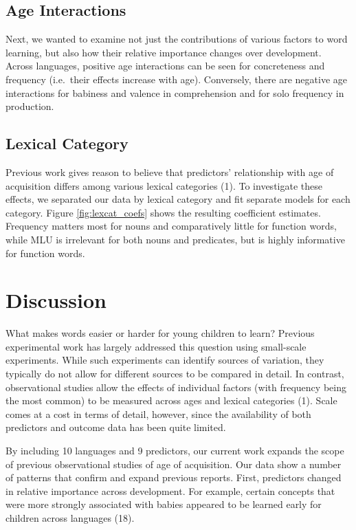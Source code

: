\documentclass[9pt,twocolumn,twoside]{pnas-new}
\begin{document}
\subsection{Age Interactions}\label{age-interactions}

Next, we wanted to examine not just the contributions of various factors
to word learning, but also how their relative importance changes over
development. Across languages, positive age interactions can be seen for
concreteness and frequency (i.e.~their effects increase with age).
Conversely, there are negative age interactions for babiness and valence
in comprehension and for solo frequency in production.

\subsection{Lexical Category}\label{lexical-category}

Previous work gives reason to believe that predictors' relationship with
age of acquisition differs among various lexical categories (1). To
investigate these effects, we separated our data by lexical category and
fit separate models for each category. Figure \ref{fig:lexcat_coefs}
shows the resulting coefficient estimates. Frequency matters most for
nouns and comparatively little for function words, while MLU is
irrelevant for both nouns and predicates, but is highly informative for
function words.

\section*{Discussion}\label{discussion}

What makes words easier or harder for young children to learn? Previous
experimental work has largely addressed this question using small-scale
experiments. While such experiments can identify sources of variation,
they typically do not allow for different sources to be compared in
detail. In contrast, observational studies allow the effects of
individual factors (with frequency being the most common) to be measured
across ages and lexical categories (1). Scale comes at a cost in terms
of detail, however, since the availability of both predictors and
outcome data has been quite limited.

By including 10 languages and 9 predictors, our current work expands the
scope of previous observational studies of age of acquisition. Our data
show a number of patterns that confirm and expand previous reports.
First, predictors changed in relative importance across development. For
example, certain concepts that were more strongly associated with babies
appeared to be learned early for children across languages (18).
\end{document}
